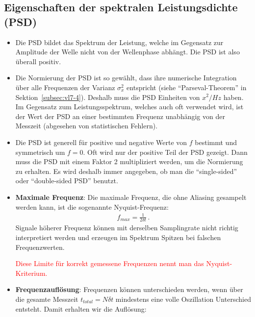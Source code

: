 \subsection{Eigenschaften der spektralen Leistungsdichte (PSD)}
\label{subsec:vl7-3}

\begin{itemize}
    \setlength\itemsep{0em}
        \item Die PSD bildet das Spektrum der Leistung, welche im Gegensatz zur Amplitude der Welle nicht von der Wellenphase abhängt. Die PSD ist also überall positiv.
        \item Die Normierung der PSD ist so gewählt, dass ihre numerische Integration über alle Frequenzen der Varianz $\sigma_x^2$ entspricht (siehe ``Parseval-Theorem'' in Sektion~\ref{subsec:vl7-4}). Deshalb muss die PSD Einheiten von $x^2/Hz$ haben. Im Gegensatz zum Leistungsspektrum, welches auch oft verwendet wird, ist der Wert der PSD an einer bestimmten Frequenz unabhängig von der Messzeit (abgesehen von statistischen Fehlern).
        \item Die PSD ist generell für positive und negative Werte von $f$ bestimmt und symmetrisch um $f=0$. Oft wird nur der positive Teil der PSD gezeigt. Dann muss die PSD mit einem Faktor 2 multipliziert werden, um die Normierung zu erhalten. Es wird deshalb immer angegeben, ob man die ``single-sided'' oder ``double-sided PSD'' benutzt.
        \item \textbf{Maximale Frequenz}: Die maximale Frequenz, die ohne Aliasing gesampelt werden kann, ist die sogenannte Nyquist-Frequenz:
        \begin{align}
        f_{max} = \frac{ 1 }{ 2 \delta t }\,.
        \label{eq:vl7-4}
        \end{align}
        Signale höherer Frequenz können mit derselben Samplingrate nicht richtig interpretiert werden und erzeugen im Spektrum Spitzen bei falschen Frequenzwerten.
        \begin{center}
        \textcolor{red}{
        Diese Limite für korrekt gemessene Frequenzen nennt man das Nyquist-Kriterium.}
        \end{center}
        \item \textbf{Frequenzaufl\"osung}: Frequenzen können unterschieden werden, wenn über die gesamte Messzeit $t_{total}=N\delta t$ mindestens eine volle Oszillation Unterschied entsteht. Damit erhalten wir die Aufl\"osung:

\end{itemize}
